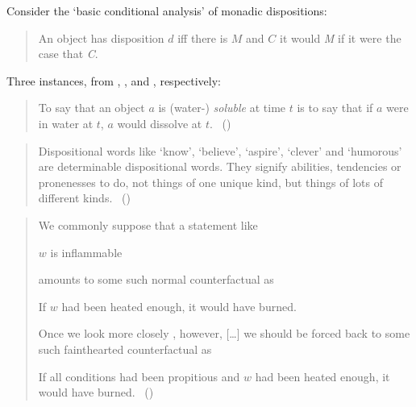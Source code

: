 \begin{note}
  Consider the `basic conditional analysis' of monadic dispositions:%

  \begin{quote}
    An object has disposition \(d\) iff there is \(M\) and \(C\) it would \emph{M} if it were the case that \emph{C}.
  \end{quote}

  Three instances, from \citeauthor{Quine:2013aa}, \citeauthor{Ryle:1949aa}, and \citeauthor{Goodman:1983aa}, respectively:

  \begin{quote}
    To say that an object \(a\) is (water-) \emph{soluble} at time \(t\) is to say that if \(a\) were in water at \(t\), \(a\) would dissolve at \(t\).%
    \mbox{ }\hfill\mbox{(\cite[203]{Quine:2013aa})}
  \end{quote}

  \begin{quote}
    Dispositional words like `know', `believe', `aspire', `clever' and `humorous' are determinable dispositional words.
    They signify abilities, tendencies or pronenesses to do, not things of one unique kind, but things of lots of different kinds.%
    \mbox{ }\hfill\mbox{(\cite[118]{Ryle:1949aa})}
  \end{quote}

  \begin{quote}
    We commonly suppose that a statement like

    \(w\) is inflammable

    amounts to some such normal counterfactual as

    If \(w\) had been heated enough, it would have burned.

    Once we look more closely , however, [\dots] we should be forced back to some such fainthearted counterfactual as

    If all conditions had been propitious and \(w\) had been heated enough, it would have burned.%
    \mbox{ }\hfill\mbox{(\cite[39]{Goodman:1983aa})}
  \end{quote}
\end{note}

